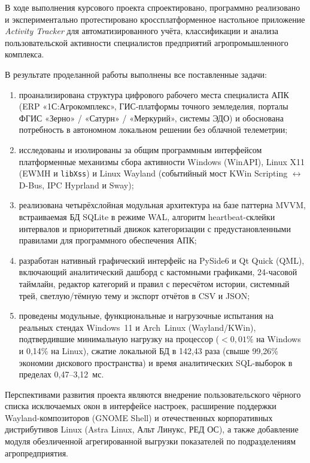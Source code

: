 \documentclass{timcw}
\begin{document}
\newpage
\conclusion

В ходе выполнения курсового проекта спроектировано, программно реализовано и экспериментально протестировано кроссплатформенное настольное приложение \emph{Activity Tracker} для автоматизированного учёта, классификации и анализа пользовательской активности специалистов предприятий агропромышленного комплекса.

В результате проделанной работы выполнены все поставленные задачи:
\begin{enumerate}
  \item проанализирована структура цифрового рабочего места специалиста АПК (ERP «1С:Агрокомплекс», ГИС-платформы точного земледелия, порталы ФГИС «Зерно» / «Сатурн» / «Меркурий», системы ЭДО) и обоснована потребность в автономном локальном решении без облачной телеметрии;
  \item исследованы и изолированы за общим программным интерфейсом платформенные механизмы сбора активности Windows (WinAPI), Linux X11 (EWMH и \texttt{libXss}) и Linux Wayland (событийный мост KWin Scripting $\leftrightarrow$ D-Bus, IPC Hyprland и Sway);
  \item реализована четырёхслойная модульная архитектура на базе паттерна MVVM, встраиваемая БД SQLite в режиме WAL, алгоритм heartbeat-склейки интервалов и приоритетный движок категоризации с предустановленными правилами для программного обеспечения АПК;
  \item разработан нативный графический интерфейс на PySide6 и Qt Quick (QML), включающий аналитический дашборд с кастомными графиками, 24-часовой таймлайн, редактор категорий и правил с пересчётом истории, системный трей, светлую/тёмную тему и экспорт отчётов в CSV и JSON;
  \item проведены модульные, функциональные и нагрузочные испытания на реальных стендах Windows~11 и Arch~Linux (Wayland/KWin), подтвердившие минимальную нагрузку на процессор ($<0{,}01\%$ на Windows и 0{,}14\% на Linux), сжатие локальной БД в 142{,}43 раза (свыше 99{,}26\% экономии дискового пространства) и время аналитических SQL-выборок в пределах 0{,}47--3{,}12~мс.
\end{enumerate}

Перспективами развития проекта являются внедрение пользовательского чёрного списка исключаемых окон в интерфейсе настроек, расширение поддержки Wayland-композиторов (GNOME Shell) и отечественных корпоративных дистрибутивов Linux (Astra Linux, Альт Линукс, РЕД ОС), а также добавление модуля обезличенной агрегированной выгрузки показателей по подразделениям агропредприятия.
\end{document}

